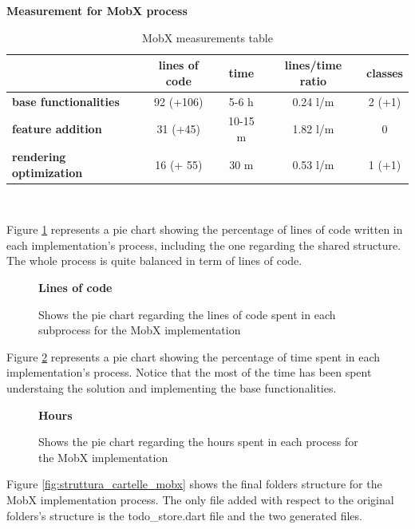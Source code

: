 \begin{table}[H]
    \caption*{\textbf{Measurement for MobX process}}
    \centering 
       \begin{tabular}{| l | c | c | c | c |}
    \hline
    \rowcolor{bluepoli!40} %
    \hline
     & \textbf{lines of code} & \textbf{time} & \textbf{lines/time ratio} & \textbf{classes} \T\B \\
     \hline
    \textbf{base functionalities} & 92 (+106) & 5-6 h & 0.24 l/m & 2 (+1) \T\B \\ 
    \textbf{feature addition} & 31 (+45) & 10-15 m & 1.82 l/m & 0 \T\B\\ 
    \textbf{rendering optimization} & 16 (+ 55) & 30 m & 0.53 l/m & 1 (+1) \B\\
    \hline
    \end{tabular}
    \\[10pt]
    \caption{MobX measurements table}
    \label{table:recap_mobx}
\end{table}

Figure \ref{image:mobx_lines_piechart} represents a pie chart showing the percentage of lines of code written in each implementation's process, including the one regarding the shared structure. The whole process is quite balanced in term of lines of code.

\begin{figure}[H]
\caption*{\textbf{Lines of code}}
\centering
{}
 \caption{Shows the pie chart regarding the lines of code spent in each subprocess for the MobX implementation}
 \label{image:mobx_lines_piechart}
\end{figure}
Figure \ref{image:mobx_hours_piechart} represents a pie chart showing the percentage of time spent in each implementation's process. Notice that the most of the time has been spent understaing the solution and implementing the base functionalities.

\begin{figure}[H]
 \caption*{\textbf{Hours}}
\centering
{}
\caption{Shows the pie chart regarding the hours spent in each process for the MobX implementation}
 \label{image:mobx_hours_piechart}
\end{figure}
Figure \ref{fig:struttura_cartelle_mobx} shows the final folders structure for the MobX implementation process. The only file added with respect to the original folders's structure is the todo\_store.dart file and the two generated files.


